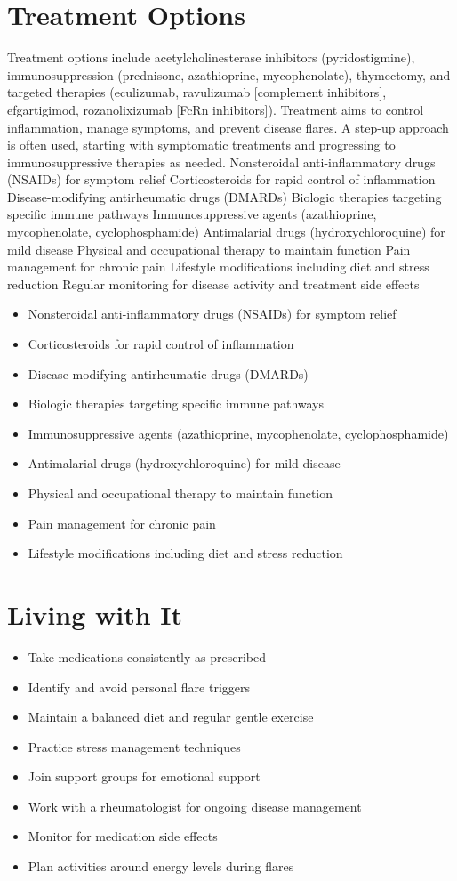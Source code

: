 \section{Treatment Options}
Treatment options include acetylcholinesterase inhibitors (pyridostigmine), immunosuppression (prednisone, azathioprine, mycophenolate), thymectomy, and targeted therapies (eculizumab, ravulizumab [complement inhibitors], efgartigimod, rozanolixizumab [FcRn inhibitors]). Treatment aims to control inflammation, manage symptoms, and prevent disease flares. A step-up approach is often used, starting with symptomatic treatments and progressing to immunosuppressive therapies as needed. Nonsteroidal anti-inflammatory drugs (NSAIDs) for symptom relief Corticosteroids for rapid control of inflammation Disease-modifying antirheumatic drugs (DMARDs) Biologic therapies targeting specific immune pathways Immunosuppressive agents (azathioprine, mycophenolate, cyclophosphamide) Antimalarial drugs (hydroxychloroquine) for mild disease Physical and occupational therapy to maintain function Pain management for chronic pain Lifestyle modifications including diet and stress reduction Regular monitoring for disease activity and treatment side effects

\begin{itemize}[noitemsep]
  \item Nonsteroidal anti-inflammatory drugs (NSAIDs) for symptom relief
  \item Corticosteroids for rapid control of inflammation
  \item Disease-modifying antirheumatic drugs (DMARDs)
  \item Biologic therapies targeting specific immune pathways
  \item Immunosuppressive agents (azathioprine, mycophenolate, cyclophosphamide)
  \item Antimalarial drugs (hydroxychloroquine) for mild disease
  \item Physical and occupational therapy to maintain function
  \item Pain management for chronic pain
  \item Lifestyle modifications including diet and stress reduction
\end{itemize}
\section{Living with It}
\begin{itemize}[noitemsep]
  \item Take medications consistently as prescribed
  \item Identify and avoid personal flare triggers
  \item Maintain a balanced diet and regular gentle exercise
  \item Practice stress management techniques
  \item Join support groups for emotional support
  \item Work with a rheumatologist for ongoing disease management
  \item Monitor for medication side effects
  \item Plan activities around energy levels during flares
\end{itemize}
